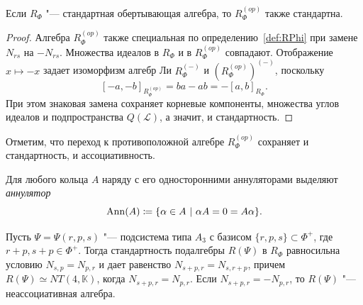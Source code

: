\documentclass[a4paper,14pt,oneside,openany]{memoir}
\begin{document}
\begin{lemma}\label{l:stand-opposite}
    Если $R_{\Phi}$ "--- стандартная обертывающая алгебра, то $R_{\Phi}^{(op)}$
    также стандартна.
\end{lemma}
\begin{proof}
    Алгебра $R_{\Phi}^{(op)}$ также специальная по определению~\ref{def:RPhi} при
    замене $N_{rs}$ на $-N_{rs}$. Множества идеалов в $R_{\Phi}$ и в
    $R_{\Phi}^{(op)}$ совпадают. Отображение $x\mapsto -x$ задает изоморфизм алгебр
    Ли $R_{\Phi}^{(-)}$ и $(R_{\Phi}^{(op)})^{(-)}$, поскольку
    \[
        [-a,-b]_{R_{\Phi}^{(op)}}=ba-ab=-[a,b]_{R_{\Phi}}.
    \]
    При этом знаковая замена сохраняет корневые компоненты, множества углов идеалов
    и подпространства $Q(\mathcal{L})$, а значит, и стандартность.
\end{proof}

Отметим, что переход к противоположной алгебре $R_{\Phi}^{(op)}$ сохраняет и
стандартность, и ассоциативность.

Для любого кольца $A$ наряду с его односторонними аннуляторами выделяют
\emph{аннулятор}
\[
    \operatorname{Ann}(A) \coloneq \{\alpha\in A\ | \ \alpha A = 0 = A\alpha\}.
\]

\begin{lemma}\label{l:stand-A3}
    Пусть $\Psi=\Psi(r, p, s)$ "--- подсистема типа $A_3$ с базисом
    $\{r,p,s\}\subset\Phi^+$, где $r+p,s+p\in\Phi^+$. Тогда стандартность
    подалгебры $R(\Psi)$ в $R_{\Phi}$ равносильна условию $N_{s,p} = N_{p, r}$ и
    дает равенство $N_{s+p,r}=N_{s,r+p}$, причем $R(\Psi) \simeq NT(4,\mathbb{K})$,
    когда $N_{s+p,r} = N_{p,r}$. Если $N_{s+p,r}= -N_{p,r}$, то $R(\Psi)$ "---
    неассоциативная алгебра.
\end{lemma}
\end{document}
